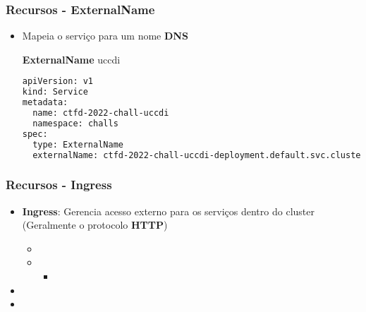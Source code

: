 \begin{frame}[containsverbatim]
\frametitle{Recursos - ExternalName}
\begin{itemize}
	\item Mapeia o serviço para um nome \textbf{DNS}
\begin{center}
\begin{minipage}{0.9\textwidth}
	\begin{block}{\textbf{ExternalName} uccdi}
\tiny
\begin{lstlisting}[language=bash]
apiVersion: v1
kind: Service
metadata:
  name: ctfd-2022-chall-uccdi
  namespace: challs
spec:
  type: ExternalName
  externalName: ctfd-2022-chall-uccdi-deployment.default.svc.cluster.local
\end{lstlisting}
\end{block}
\end{minipage}
\end{center}
\end{itemize}
\end{frame}

\begin{frame}
\frametitle{Recursos - Ingress}
\begin{itemize}
	\item \textbf{Ingress}: Gerencia acesso externo para os serviços dentro do cluster (Geralmente o protocolo \textbf{HTTP})
		\begin{itemize}
			\item {}
			\item {}
				\begin{itemize}
					\item {}
				\end{itemize}
		\end{itemize}
	\item {}
	\item {}
\end{itemize}
\end{frame}

